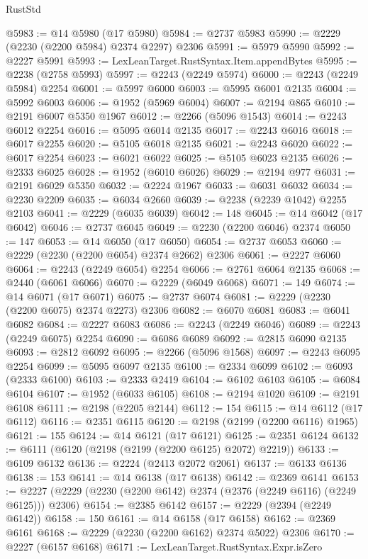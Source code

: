 \begin{lexlean}{RustStd}
\begin{coremodule}
@5983 := @14 @5980 (@17 @5980)
@5984 := @2737 @5983
@5990 := @2229 (@2230 (@2200 @5984) @2374 @2297) @2306
@5991 := @5979 @5990
@5992 := @2227 @5991
@5993 := LexLeanTarget.RustSyntax.Item.appendBytes
@5995 := @2238 (@2758 @5993)
@5997 := @2243 (@2249 @5974)
@6000 := @2243 (@2249 @5984) @2254
@6001 := @5997 @6000
@6003 := @5995 @6001 @2135
@6004 := @5992 @6003
@6006 := @1952 (@5969 @6004)
@6007 := @2194 @865
@6010 := @2191 @6007 @5350 @1967
@6012 := @2266 (@5096 @1543)
@6014 := @2243 @6012 @2254
@6016 := @5095 @6014 @2135
@6017 := @2243 @6016
@6018 := @6017 @2255
@6020 := @5105 @6018 @2135
@6021 := @2243 @6020
@6022 := @6017 @2254
@6023 := @6021 @6022
@6025 := @5105 @6023 @2135
@6026 := @2333 @6025
@6028 := @1952 (@6010 @6026)
@6029 := @2194 @977
@6031 := @2191 @6029 @5350
@6032 := @2224 @1967
@6033 := @6031 @6032
@6034 := @2230 @2209
@6035 := @6034 @2660
@6039 := @2238 (@2239 @1042) @2255 @2103
@6041 := @2229 (@6035 @6039)
@6042 := 148
@6045 := @14 @6042 (@17 @6042)
@6046 := @2737 @6045
@6049 := @2230 (@2200 @6046) @2374
@6050 := 147
@6053 := @14 @6050 (@17 @6050)
@6054 := @2737 @6053
@6060 := @2229 (@2230 (@2200 @6054) @2374 @2662) @2306
@6061 := @2227 @6060
@6064 := @2243 (@2249 @6054) @2254
@6066 := @2761 @6064 @2135
@6068 := @2440 (@6061 @6066)
@6070 := @2229 (@6049 @6068)
@6071 := 149
@6074 := @14 @6071 (@17 @6071)
@6075 := @2737 @6074
@6081 := @2229 (@2230 (@2200 @6075) @2374 @2273) @2306
@6082 := @6070 @6081
@6083 := @6041 @6082
@6084 := @2227 @6083
@6086 := @2243 (@2249 @6046)
@6089 := @2243 (@2249 @6075) @2254
@6090 := @6086 @6089
@6092 := @2815 @6090 @2135
@6093 := @2812 @6092
@6095 := @2266 (@5096 @1568)
@6097 := @2243 @6095 @2254
@6099 := @5095 @6097 @2135
@6100 := @2334 @6099
@6102 := @6093 (@2333 @6100)
@6103 := @2333 @2419
@6104 := @6102 @6103
@6105 := @6084 @6104
@6107 := @1952 (@6033 @6105)
@6108 := @2194 @1020
@6109 := @2191 @6108
@6111 := @2198 (@2205 @2144)
@6112 := 154
@6115 := @14 @6112 (@17 @6112)
@6116 := @2351 @6115
@6120 := @2198 (@2199 (@2200 @6116) @1965)
@6121 := 155
@6124 := @14 @6121 (@17 @6121)
@6125 := @2351 @6124
@6132 := @6111 (@6120 (@2198 (@2199 (@2200 @6125) @2072) @2219))
@6133 := @6109 @6132
@6136 := @2224 (@2413 @2072 @2061)
@6137 := @6133 @6136
@6138 := 153
@6141 := @14 @6138 (@17 @6138)
@6142 := @2369 @6141
@6153 := @2227 (@2229 (@2230 (@2200 @6142) @2374 (@2376 (@2249 @6116) (@2249 @6125))) @2306)
@6154 := @2385 @6142
@6157 := @2229 (@2394 (@2249 @6142))
@6158 := 150
@6161 := @14 @6158 (@17 @6158)
@6162 := @2369 @6161
@6168 := @2229 (@2230 (@2200 @6162) @2374 @5022) @2306
@6170 := @2227 (@6157 @6168)
@6171 := LexLeanTarget.RustSyntax.Expr.isZero

\end{coremodule}
\end{lexlean}
